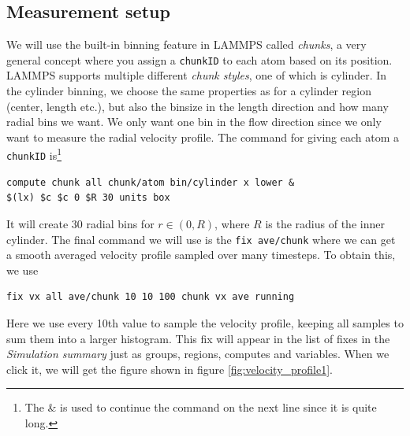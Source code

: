 \documentclass[12pt,a4paper,final]{iopart}
\newcommand{\code}[1]{\colorbox{light-gray}{\color{RawSienna}\texttt{#1}}}
\begin{document}
\subsection{Measurement setup}
We will use the built-in binning feature in LAMMPS called \textit{chunks}, a very general concept where you assign a \code{chunkID} to each atom
based on its position. LAMMPS supports multiple different \textit{chunk styles}, one of which is cylinder.
In the cylinder binning, we choose the same properties as for a cylinder region (center, length etc.), but also the binsize in the length direction and how many radial bins we want.
We only want one bin in the flow direction since we only want to measure the radial velocity profile.
The command for giving each atom a \code{chunkID} is\footnote{The \& is used to continue the command on the next line since it is quite long.}
\begin{lstlisting}
compute chunk all chunk/atom bin/cylinder x lower &
$(lx) $c $c 0 $R 30 units box
\end{lstlisting}
It will create 30 radial bins for $r\in (0, R)$, where $R$ is the radius of the inner cylinder.
The final command we will use is the \code{fix ave/chunk} where we can get a smooth averaged velocity profile sampled over many timesteps.
To obtain this, we use
\begin{lstlisting}
fix vx all ave/chunk 10 10 100 chunk vx ave running
\end{lstlisting}
Here we use every 10th value to sample the velocity profile, keeping all samples to sum them into a larger histogram.
This fix will appear in the list of fixes in the \textit{Simulation summary} just as groups, regions, computes and variables.
When we click it, we will get the figure shown in figure \ref{fig:velocity_profile1}.
\end{document}
